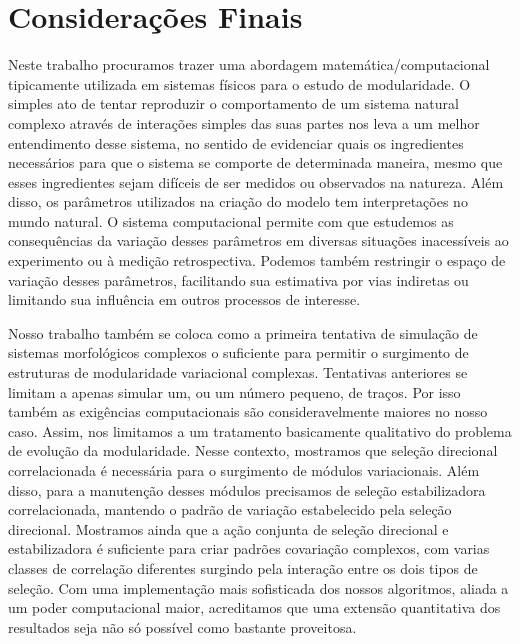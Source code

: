 \pagestyle{empty}
\cleardoublepage
\pagestyle{fancy}
\chapter{Considerações Finais}
\label{cap5}

Neste trabalho procuramos trazer uma abordagem matemática/computacional
tipicamente utilizada em sistemas físicos para o estudo de
modularidade. 
O simples ato de tentar reproduzir o comportamento de um sistema natural
complexo através de interações simples das suas partes nos leva a um melhor
entendimento desse sistema, no sentido de evidenciar quais os
ingredientes necessários para que o sistema se comporte de determinada
maneira, mesmo que esses ingredientes sejam difíceis de ser medidos ou
observados na natureza. 
Além disso, os parâmetros utilizados na criação do modelo tem
interpretações no mundo natural. 
O sistema computacional permite com que estudemos as consequências da
variação desses parâmetros em diversas situações inacessíveis ao
experimento ou à medição retrospectiva. 
Podemos também restringir o espaço de variação desses parâmetros,
facilitando sua estimativa por vias indiretas ou limitando sua
influência em outros processos de interesse. 

Nosso trabalho também se coloca como a primeira tentativa de simulação
de sistemas morfológicos complexos o suficiente para permitir o
surgimento de estruturas de modularidade variacional complexas. 
Tentativas anteriores se limitam a apenas simular um, ou um número
pequeno, de traços. 
Por isso também as exigências computacionais são consideravelmente
maiores no nosso caso. 
Assim, nos limitamos a um tratamento basicamente qualitativo do problema
de evolução da modularidade. 
Nesse contexto, mostramos que seleção direcional correlacionada é
necessária para o surgimento de módulos variacionais. 
Além disso, para a manutenção desses módulos precisamos de seleção
estabilizadora correlacionada, mantendo o padrão de variação
estabelecido pela seleção direcional.
Mostramos ainda que a ação conjunta de seleção direcional e
estabilizadora é suficiente para criar padrões covariação complexos, com
varias classes de correlação diferentes surgindo pela interação entre
os dois tipos de seleção.
Com uma implementação mais sofisticada dos
nossos algoritmos, aliada a um poder computacional maior, acreditamos
que uma extensão quantitativa dos resultados seja não só possível como
bastante proveitosa. 


